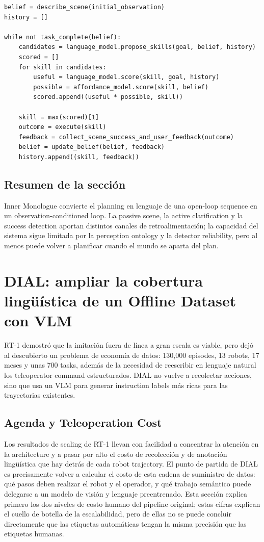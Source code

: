 \documentclass[a4paper]{article}
\begin{document}
\begin{lstlisting}[caption={Closed-loop planner de SayCan + Inner Monologue},label={lst:closed-loop-planner}]
belief = describe_scene(initial_observation)
history = []

while not task_complete(belief):
    candidates = language_model.propose_skills(goal, belief, history)
    scored = []
    for skill in candidates:
        useful = language_model.score(skill, goal, history)
        possible = affordance_model.score(skill, belief)
        scored.append((useful * possible, skill))

    skill = max(scored)[1]
    outcome = execute(skill)
    feedback = collect_scene_success_and_user_feedback(outcome)
    belief = update_belief(belief, feedback)
    history.append((skill, feedback))
\end{lstlisting}

\subsection{Resumen de la sección}

Inner Monologue convierte el planning en lenguaje de una open-loop sequence en un observation-conditioned loop. La passive scene, la active clarification y la success detection aportan distintos canales de retroalimentación; la capacidad del sistema sigue limitada por la perception ontology y la detector reliability, pero al menos puede volver a planificar cuando el mundo se aparta del plan.
\section{DIAL: ampliar la cobertura lingüística de un Offline Dataset con VLM}

RT-1 demostró que la imitación fuera de línea a gran escala es viable, pero dejó al descubierto un problema de economía de datos: 130,000 episodes, 13 robots, 17 meses y unas 700 tasks, además de la necesidad de reescribir en lenguaje natural los teleoperator command estructurados. DIAL no vuelve a recolectar acciones, sino que usa un VLM para generar instruction labels más ricas para las trayectorias existentes.

\subsection{Agenda y Teleoperation Cost}

Los resultados de scaling de RT-1 llevan con facilidad a concentrar la atención en la architecture y a pasar por alto el costo de recolección y de anotación lingüística que hay detrás de cada robot trajectory. El punto de partida de DIAL es precisamente volver a calcular el costo de esta cadena de suministro de datos: qué pasos deben realizar el robot y el operador, y qué trabajo semántico puede delegarse a un modelo de visión y lenguaje preentrenado. Esta sección explica primero los dos niveles de costo humano del pipeline original; estas cifras explican el cuello de botella de la escalabilidad, pero de ellas no se puede concluir directamente que las etiquetas automáticas tengan la misma precisión que las etiquetas humanas.
\end{document}
